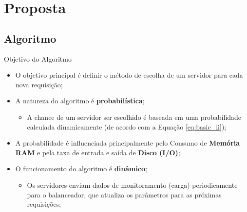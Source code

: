 \documentclass[10pt]{beamer}
\begin{document}


\section{Proposta}

\subsection{Algoritmo}

\begin{frame}{Objetivo do Algoritmo}

\begin{itemize}
    \item O objetivo principal é definir o método de escolha de um servidor para cada nova requisição;
    
    \bigskip
    
    \item A natureza do algoritmo é \textbf{probabilística};
    \begin{itemize}
        \item A chance de um servidor ser escolhido é baseada em uma probabilidade calculada dinamicamente (de acordo com a Equação \mbox{\ref{eq:basic_li}});
    \end{itemize}
    
    \bigskip
    
    \item A probabilidade é influenciada principalmente pelo Consumo de \textbf{Memória RAM} e pela taxa de entrada e saída de \textbf{Disco (I/O)};
    
    \bigskip
    
    \item O funcionamento do algoritmo é \textbf{dinâmico};
    \begin{itemize}
        \item Os servidores enviam dados de monitoramento (carga) periodicamente para o balanceador, que atualiza os parâmetros para as próximas requisições;
    \end{itemize}
\end{itemize}

\end{frame}
\end{document}
